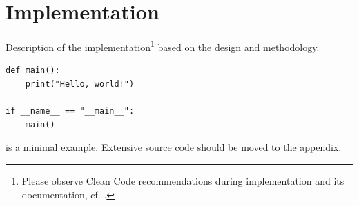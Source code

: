 \chapter{Implementation}
\label{ch:implementation}

Description of the implementation\footnote{Please observe Clean Code
recommendations during implementation and its documentation, cf.
\cite{martin2008}.} based on the design and methodology.

\begin{lstlisting}[caption={Example: Hello World (Python)}, label={lst:hello}]
def main():
    print("Hello, world!")

if __name__ == "__main__":
    main()
\end{lstlisting}

 is a minimal example. Extensive source code should be moved to
the appendix.
